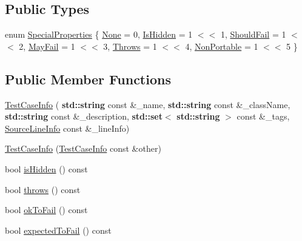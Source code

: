 \subsection*{Public Types}
\begin{DoxyCompactItemize}
\item 
enum \hyperlink{struct_catch_1_1_test_case_info_a39b232f74b4a7a6f2183b96759027eac}{Special\+Properties} \{ \newline
\hyperlink{struct_catch_1_1_test_case_info_a39b232f74b4a7a6f2183b96759027eacaf94e9de5f8ec1e53b1aa761ec564b31a}{None} = 0, 
\hyperlink{struct_catch_1_1_test_case_info_a39b232f74b4a7a6f2183b96759027eacaeda53906c14c3973e0980900c132b8f7}{Is\+Hidden} = 1 $<$$<$ 1, 
\hyperlink{struct_catch_1_1_test_case_info_a39b232f74b4a7a6f2183b96759027eacaf9002285bccfc343935958f3953f4c01}{Should\+Fail} = 1 $<$$<$ 2, 
\hyperlink{struct_catch_1_1_test_case_info_a39b232f74b4a7a6f2183b96759027eacadf1873d3271121cb9f52d7df45b416ca}{May\+Fail} = 1 $<$$<$ 3, 
\newline
\hyperlink{struct_catch_1_1_test_case_info_a39b232f74b4a7a6f2183b96759027eaca4704adf89ed7f7ad653d08f99813a974}{Throws} = 1 $<$$<$ 4, 
\hyperlink{struct_catch_1_1_test_case_info_a39b232f74b4a7a6f2183b96759027eaca06472887b53fda9eb8015d74e7fd2cf1}{Non\+Portable} = 1 $<$$<$ 5
 \}
\end{DoxyCompactItemize}
\subsection*{Public Member Functions}
\begin{DoxyCompactItemize}
\item 
\hyperlink{struct_catch_1_1_test_case_info_a35ec65315e0d1f178491b5a59f3f3123}{Test\+Case\+Info} (\textbf{ std\+::string} const \&\+\_\+name, \textbf{ std\+::string} const \&\+\_\+class\+Name, \textbf{ std\+::string} const \&\+\_\+description, \textbf{ std\+::set}$<$ \textbf{ std\+::string} $>$ const \&\+\_\+tags, \hyperlink{struct_catch_1_1_source_line_info}{Source\+Line\+Info} const \&\+\_\+line\+Info)
\item 
\hyperlink{struct_catch_1_1_test_case_info_ac338adb4e38f4bf3977fb45b2b1fe447}{Test\+Case\+Info} (\hyperlink{struct_catch_1_1_test_case_info}{Test\+Case\+Info} const \&other)
\item 
bool \hyperlink{struct_catch_1_1_test_case_info_a934b1a0952700743e99d62ec1731a2e2}{is\+Hidden} () const
\item 
bool \hyperlink{struct_catch_1_1_test_case_info_afc70d4379a2070cc22b693ffe3932c1a}{throws} () const
\item 
bool \hyperlink{struct_catch_1_1_test_case_info_a5f37291295e3a6de2dd85324c941edaf}{ok\+To\+Fail} () const
\item 
bool \hyperlink{struct_catch_1_1_test_case_info_abe33d81233230cdae8afa714688e905b}{expected\+To\+Fail} () const
\end{DoxyCompactItemize}
